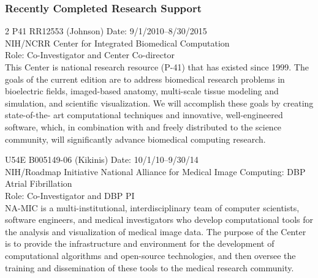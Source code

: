 \documentclass[10pt]{article}
\begin{document}
\noindent
\subsubsection*{Recently Completed Research Support}

\noindent
\parbox{\columnwidth}{
2 P41 RR12553 (Johnson) Date: 9/1/2010--8/30/2015\\
NIH/NCRR Center for Integrated Biomedical Computation\\
Role: Co-Investigator and Center Co-director \\
This Center is national research resource (P-41) that has existed since
1999. The goals of the current edition are to address biomedical research
problems in bioelectric fields, imaged-based anatomy, multi-scale tissue
modeling and simulation, and scientific visualization. We will accomplish
these goals by creating state-of-the- art computational techniques and
innovative, well-engineered software, which, in combination with and freely
distributed to the science community, will significantly advance biomedical
computing research.}

\medskip

\noindent
\parbox{\columnwidth}{
U54E B005149-06 (Kikinis)  Date: 10/1/10--9/30/14\\
NIH/Roadmap Initiative National Alliance for Medical Image Computing: DBP
Atrial Fibrillation\\
Role: Co-Investigator and DBP PI\\
NA-MIC is a multi-institutional, interdisciplinary team of computer
scientists, software engineers, and medical investigators who develop
computational tools for the analysis and visualization of medical image
data. The purpose of the Center is to provide the infrastructure and
environment for the development of computational algorithms and open-source
technologies, and then oversee the training and dissemination of these
tools to the medical research community.}
\end{document}
